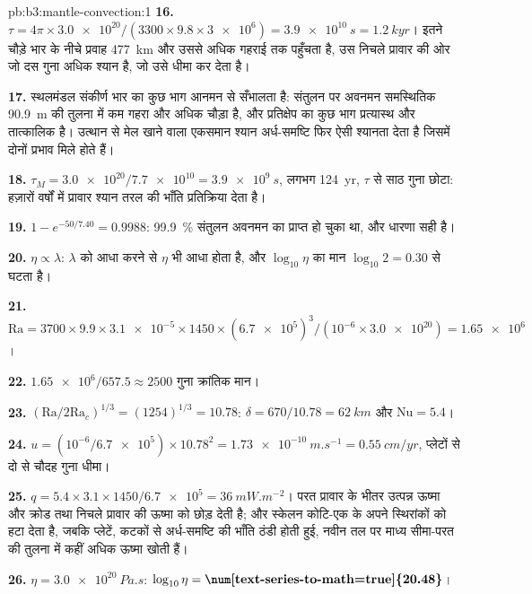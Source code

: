 \begin{solution}{pb:b3:mantle-convection:1}
\textbf{16.} $\tau = 4\pi\times\num{3.0e20}/(3300\times9.8\times\num{3e6}) =
\qty{3.9e10}{s} = \qty{1.2}{kyr}$। इतने चौड़े भार के नीचे प्रवाह
\qty{477}{km} और उससे अधिक गहराई तक पहुँचता है, उस निचले प्रावार की ओर जो दस गुना अधिक श्यान है,
जो उसे धीमा कर देता है।

\textbf{17.} स्थलमंडल संकीर्ण भार का कुछ भाग आनमन से सँभालता है: संतुलन पर अवनमन
समस्थितिक \qty{90.9}{m} की तुलना में कम गहरा और अधिक चौड़ा है, और
प्रतिक्षेप का कुछ भाग प्रत्यास्थ और तात्कालिक है। उत्थान से मेल खाने वाला एकसमान श्यान अर्ध-समष्टि
फिर ऐसी श्यानता देता है जिसमें दोनों प्रभाव मिले होते हैं।

\textbf{18.} $\tau_M = \num{3.0e20}/\num{7.7e10} = \qty{3.9e9}{s}$, लगभग
\qty{124}{yr}, $\tau$ से साठ गुना छोटा: हज़ारों वर्षों में प्रावार
श्यान तरल की भाँति प्रतिक्रिया देता है।

\textbf{19.} $1 - e^{-50/7.40} = 0.9988$: \qty{99.9}{\percent} संतुलन अवनमन का
प्राप्त हो चुका था, और धारणा सही है।

\textbf{20.} $\eta \propto \lambda$: $\lambda$ को आधा करने से $\eta$ भी आधा होता है, और
$\log_{10}\eta$ का मान $\log_{10}2 = 0.30$ से घटता है।

\textbf{21.} $\mathrm{Ra} = 3700\times9.9\times\num{3.1e-5}\times1450\times
(\num{6.7e5})^3/(10^{-6}\times\num{3.0e20}) = \num{1.65e6}$।

\textbf{22.} $\num{1.65e6}/657.5 \approx 2500$ गुना क्रांतिक मान।

\textbf{23.} $(\mathrm{Ra}/2\mathrm{Ra}_c)^{1/3} = (1254)^{1/3} = 10.78$: $\delta
= 670/10.78 = \qty{62}{km}$ और $\mathrm{Nu} = 5.4$।

\textbf{24.} $u = (10^{-6}/\num{6.7e5})\times10.78^2 = \qty{1.73e-10}{m.s^{-1}}
= \qty{0.55}{cm/yr}$, प्लेटों से दो से चौदह गुना धीमा।

\textbf{25.} $q = 5.4\times3.1\times1450/\num{6.7e5} = \qty{36}{mW.m^{-2}}$।
परत प्रावार के भीतर उत्पन्न ऊष्मा और
क्रोड तथा निचले प्रावार की ऊष्मा को छोड़ देती है; और स्केलन कोटि-एक के अपने स्थिरांकों को हटा देता है,
जबकि प्लेटें, कटकों से अर्ध-समष्टि की भाँति ठंडी होती हुई, नवीन तल पर
माध्य सीमा-परत की तुलना में कहीं अधिक ऊष्मा खोती हैं।

\textbf{26.} $\eta = \qty{3.0e20}{Pa.s}$: $\log_{10}\eta =
\textbf{\num[text-series-to-math=true]{20.48}}$।
\end{solution}

